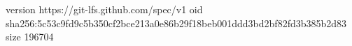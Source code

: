 version https://git-lfs.github.com/spec/v1
oid sha256:5c53c9fd9c5b350cf2bce213a0e86b29f18beb001ddd3bd2bf82fd3b385b2d83
size 196704

